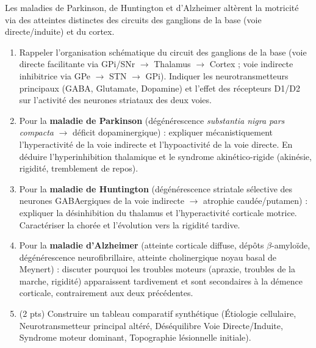 \documentclass[11pt]{article}
\begin{document}
\begin{exercice}
Les maladies de Parkinson, de Huntington et d'Alzheimer altèrent la motricité via des atteintes distinctes des circuits des ganglions de la base (voie directe/induite) et du cortex.
\begin{enumerate}
    \item Rappeler l'organisation schématique du circuit des ganglions de la base (voie directe facilitante via GPi/SNr $\rightarrow$ Thalamus $\rightarrow$ Cortex ; voie indirecte inhibitrice via GPe $\rightarrow$ STN $\rightarrow$ GPi). Indiquer les neurotransmetteurs principaux (GABA, Glutamate, Dopamine) et l'effet des récepteurs D1/D2 sur l'activité des neurones striataux des deux voies.
    \item Pour la \textbf{maladie de Parkinson} (dégénérescence \textit{substantia nigra pars compacta} $\rightarrow$ déficit dopaminergique) : expliquer mécanistiquement l'hyperactivité de la voie indirecte et l'hypoactivité de la voie directe. En déduire l'hyperinhibition thalamique et le syndrome akinético-rigide (akinésie, rigidité, tremblement de repos).
    \item Pour la \textbf{maladie de Huntington} (dégénérescence striatale sélective des neurones GABAergiques de la voie indirecte $\rightarrow$ atrophie caudée/putamen) : expliquer la désinhibition du thalamus et l'hyperactivité corticale motrice. Caractériser la chorée et l'évolution vers la rigidité tardive.
    \item Pour la \textbf{maladie d'Alzheimer} (atteinte corticale diffuse, dépôts $\beta$-amyloïde, dégénérescence neurofibrillaire, atteinte cholinergique noyau basal de Meynert) : discuter pourquoi les troubles moteurs (apraxie, troubles de la marche, rigidité) apparaissent tardivement et sont secondaires à la démence corticale, contrairement aux deux précédentes.
    \item (2 pts) Construire un tableau comparatif synthétique (Étiologie cellulaire, Neurotransmetteur principal altéré, Déséquilibre Voie Directe/Induite, Syndrome moteur dominant, Topographie lésionnelle initiale).
\end{enumerate}
\end{exercice}
\end{document}
